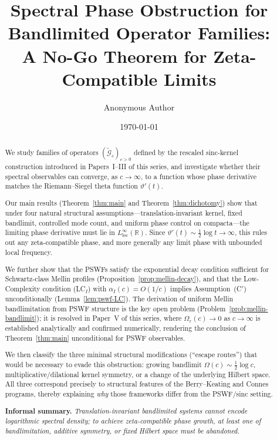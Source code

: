 \documentclass[12pt,a4paper]{amsart}
\title[No-Go for Zeta-Compatible Bandlimited Operators]
{Spectral Phase Obstruction for Bandlimited Operator
Families:\\
A No-Go Theorem for Zeta-Compatible Limits}
\author{Anonymous Author}
\date{\today}
\theoremstyle{definition}
\newcommand{\tGc}{\widetilde{\mathcal{G}}_c}
\begin{document}
\maketitle

\begin{abstract}
We study families of operators $(\tGc)_{c>0}$ defined by
the rescaled sinc-kernel construction introduced in
Papers~I--III of this series, and investigate whether their
spectral observables can converge, as $c \to \infty$, to a
function whose phase derivative matches the Riemann--Siegel
theta function $\vartheta'(t)$.

Our main results (Theorem~\ref{thm:main} and
Theorem~\ref{thm:dichotomy}) show that under four natural
structural assumptions---translation-invariant kernel, fixed
bandlimit, controlled mode count, and uniform phase control
on compacta---the limiting phase derivative must lie in
$L^\infty_{\mathrm{loc}}(\mathbb{R})$.
Since $\vartheta'(t) \sim \tfrac{1}{2}\log t \to \infty$,
this rules out any zeta-compatible phase, and more generally
any limit phase with unbounded local frequency.

We further show that the PSWFs satisfy the exponential decay
condition sufficient for Schwartz-class Mellin profiles
(Proposition~\ref{prop:mellin-decay}), and that the
Low-Complexity condition \textnormal{(LC$_I$)} with
$\alpha_I(c) = O(1/c)$ implies
Assumption~\textnormal{(C$'$)} unconditionally
(Lemma~\ref{lem:pswf-LC}). The derivation of uniform Mellin
bandlimitation from PSWF structure is the key open problem
(Problem~\ref{prob:mellin-bandlimit}); it is resolved in
Paper~V of this series, where $\Omega_\varepsilon(c) \to 0$
as $c \to \infty$ is established analytically and confirmed
numerically, rendering the conclusion of
Theorem~\ref{thm:main} unconditional for PSWF observables.

We then classify the three minimal structural modifications
(``escape routes'') that would be necessary to evade this
obstruction: growing bandlimit
$\Omega(c) \sim \tfrac{1}{2}\log c$,
multiplicative/dilational kernel symmetry, or a change of
the underlying Hilbert space. All three correspond precisely
to structural features of the Berry--Keating and Connes
programs, thereby explaining \emph{why} those frameworks
differ from the PSWF/sinc setting.

\medskip
\noindent\textbf{Informal summary.}
\emph{Translation-invariant bandlimited systems cannot
encode logarithmic spectral density; to achieve
zeta-compatible phase growth, at least one of
bandlimitation, additive symmetry, or fixed Hilbert space
must be abandoned.}
\end{abstract}
\end{document}
